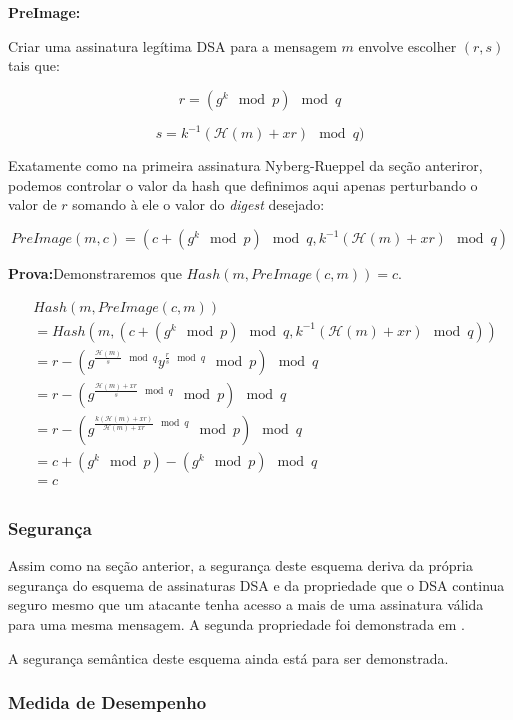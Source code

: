 \documentclass[a4paper]{article}
\begin{document}
\textbf{PreImage:}

Criar uma assinatura legítima DSA para a mensagem $m$ envolve escolher
$(r, s)$ tais que:

$$
r = (g^k \mod p) \mod q
$$

$$
s = k^{-1}(\mathcal{H}(m)+xr) \mod q)
$$

Exatamente como na primeira assinatura Nyberg-Rueppel da seção
anteriror, podemos controlar o valor da hash que definimos aqui apenas
perturbando o valor de $r$ somando à ele o valor do \textit{digest}
desejado:

$$
PreImage(m, c) = (c + (g^k \mod p) \mod q,k^{-1}(\mathcal{H}(m)+xr) \mod q)
$$

\textbf{Prova:}Demonstraremos que $Hash(m, PreImage(c, m)) = c$.

\begin{equation*}
  \begin{split}
    &Hash(m, PreImage(c, m))\\
    &= Hash(m, (c + (g^k \mod p) \mod q, k^{-1}(\mathcal{H}(m)+xr) \mod q))\\
    &= r - (g^{\frac{\mathcal{H}(m)}{s} \mod q}y^{\frac{r}{s} \mod q} \mod p) \mod q\\
    &= r - (g^{\frac{\mathcal{H}(m)+xr}{s} \mod q} \mod p) \mod q\\
    &= r - (g^{\frac{k(\mathcal{H}(m)+xr)}{\mathcal{H}(m)+xr} \mod q} \mod p) \mod q\\
    &= c + (g^k \mod p) - (g^{k} \mod p) \mod q\\
    &= c\\
    \end{split}
\end{equation*}

\subsubsection{Segurança}

Assim como na seção anterior, a segurança deste esquema deriva da
própria segurança do esquema de assinaturas DSA e da propriedade que o
DSA continua seguro mesmo que um atacante tenha acesso a mais de uma
assinatura válida para uma mesma mensagem. A segunda propriedade foi
demonstrada em \cite{twin}.

A segurança semântica deste esquema ainda está para ser demonstrada.

\subsubsection{Medida de Desempenho}
\end{document}
